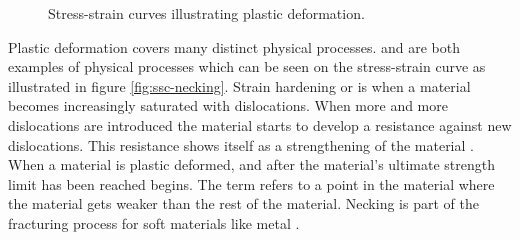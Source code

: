 \begin{figure}
  \centering
  \caption{Stress-strain curves illustrating plastic deformation.}
  \label{fig:ssc-plasticity}
\end{figure}


Plastic deformation covers many distinct physical
processes.  and  are both
examples of physical processes which can be seen on the stress-strain
curve as illustrated in figure \vref{fig:ssc-necking}.
%
Strain hardening or  is when a material becomes
increasingly saturated with dislocations. When more and more
dislocations are introduced the material starts to develop a
resistance against new dislocations. This resistance shows itself as a
strengthening of the material .
%
When a material is plastic deformed, and after the material's ultimate
strength limit has been reached  begins. The term
 refers to a point in the material where the material
gets weaker than the rest of the material. Necking is part of
the fracturing process for soft materials like metal
.

